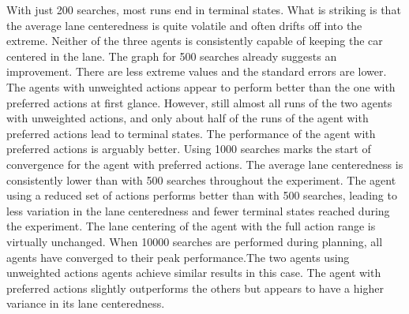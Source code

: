 With just 200 searches, most runs end in terminal states. What is striking is that the average lane centeredness is quite volatile and often drifts off into the extreme. Neither of the three agents is consistently capable of keeping the car centered in the lane. The graph for 500 searches already suggests an improvement. There are less extreme values and the standard errors are lower. The agents with unweighted actions appear to perform better than the one with preferred actions at first glance. However, still almost all runs of the two agents with unweighted actions, and only about half of the runs of the agent with preferred actions lead to terminal states. The performance of the agent with preferred actions is arguably better. Using 1000 searches marks the start of convergence for the agent with preferred actions. The average lane centeredness is consistently lower than with 500 searches throughout the experiment. The agent using a reduced set of actions performs better than with 500 searches, leading to less variation in the lane centeredness and fewer terminal states reached during the experiment. The lane centering of the agent with the full action range is virtually unchanged. When 10000 searches are performed during planning, all agents have converged to their peak performance.The two agents using unweighted actions agents achieve similar results in this case. The agent with preferred actions slightly outperforms the others but appears to have a higher variance in its lane centeredness.







% 




